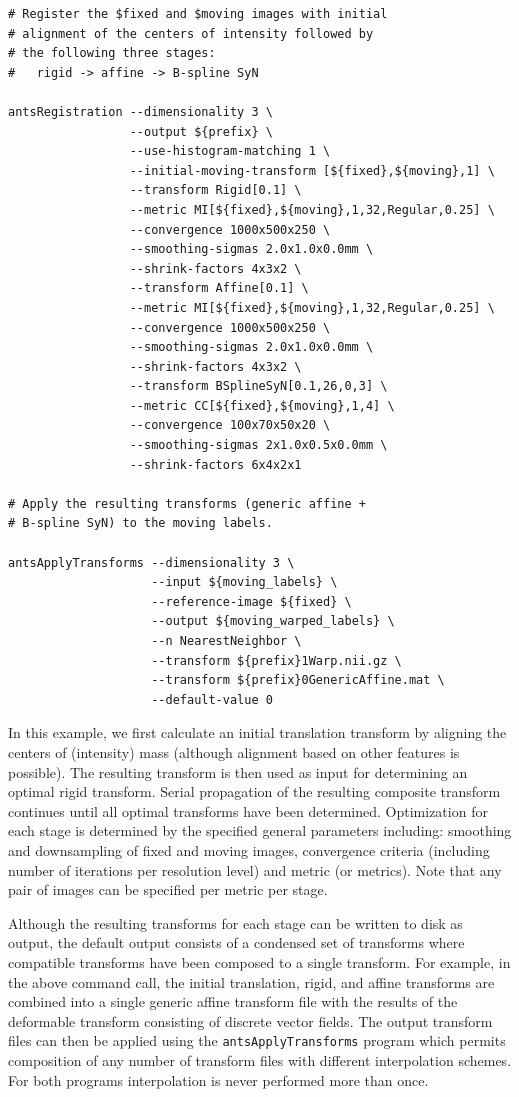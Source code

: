 \documentclass{frontiersSCNS}
\begin{document}
\begin{lstlisting}
# Register the $fixed and $moving images with initial
# alignment of the centers of intensity followed by 
# the following three stages:
#   rigid -> affine -> B-spline SyN

antsRegistration --dimensionality 3 \
                 --output ${prefix} \
                 --use-histogram-matching 1 \
                 --initial-moving-transform [${fixed},${moving},1] \
                 --transform Rigid[0.1] \
                 --metric MI[${fixed},${moving},1,32,Regular,0.25] \ 
                 --convergence 1000x500x250 \
                 --smoothing-sigmas 2.0x1.0x0.0mm \
                 --shrink-factors 4x3x2 \
                 --transform Affine[0.1] \
                 --metric MI[${fixed},${moving},1,32,Regular,0.25] \ 
                 --convergence 1000x500x250 \
                 --smoothing-sigmas 2.0x1.0x0.0mm \
                 --shrink-factors 4x3x2 \
                 --transform BSplineSyN[0.1,26,0,3] \
                 --metric CC[${fixed},${moving},1,4] \ 
                 --convergence 100x70x50x20 \
                 --smoothing-sigmas 2x1.0x0.5x0.0mm \
                 --shrink-factors 6x4x2x1

# Apply the resulting transforms (generic affine + 
# B-spline SyN) to the moving labels.
                   
antsApplyTransforms --dimensionality 3 \
                    --input ${moving_labels} \
                    --reference-image ${fixed} \
                    --output ${moving_warped_labels} \
                    --n NearestNeighbor \
                    --transform ${prefix}1Warp.nii.gz \
                    --transform ${prefix}0GenericAffine.mat \
                    --default-value 0
\end{lstlisting}
In this example, we first calculate an initial translation transform by aligning
the centers of (intensity) mass (although alignment based on other features is possible). 
The resulting transform is then used as input 
for determining an optimal rigid transform.  Serial propagation of the resulting
composite transform continues until all optimal transforms have been determined.
Optimization for each stage is determined by the specified general parameters 
including: smoothing and downsampling of fixed and moving images, convergence
criteria (including number of iterations per resolution level) and metric (or
metrics).  Note that any pair of images can be specified per metric per stage.  

Although the
resulting transforms for each stage can be written to disk as output, the 
default output consists of a condensed set of transforms where compatible 
transforms have been composed to a single transform.  For example, in the
above command call, the initial translation, rigid, and affine transforms are
combined into a single generic affine transform file with the results of the
deformable transform consisting of discrete vector fields.  The output
transform files can then be applied using the {\tt antsApplyTransforms}
program which permits composition of any number of transform files with 
different interpolation schemes.   For both programs interpolation is never
performed more than once. 
\end{document}
